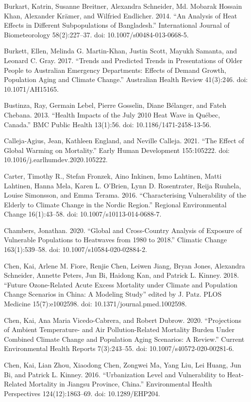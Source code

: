 \documentclass[12pt]{article}
\begin{document}
Burkart, Katrin, Susanne Breitner, Alexandra Schneider, Md. Mobarak
Hossain Khan, Alexander Krämer, and Wilfried Endlicher. 2014. ``An
Analysis of Heat Effects in Different Subpopulations of Bangladesh.''
International Journal of Biometeorology 58(2):227--37. doi:
10.1007/s00484-013-0668-5.

Burkett, Ellen, Melinda G. Martin-Khan, Justin Scott, Mayukh Samanta,
and Leonard C. Gray. 2017. ``Trends and Predicted Trends in
Presentations of Older People to Australian Emergency Departments:
Effects of Demand Growth, Population Aging and Climate Change.''
Australian Health Review 41(3):246. doi: 10.1071/AH15165.

Bustinza, Ray, Germain Lebel, Pierre Gosselin, Diane Bélanger, and Fateh
Chebana. 2013. ``Health Impacts of the July 2010 Heat Wave in Québec,
Canada.'' BMC Public Health 13(1):56. doi: 10.1186/1471-2458-13-56.

Calleja-Agius, Jean, Kathleen England, and Neville Calleja. 2021. ``The
Effect of Global Warming on Mortality.'' Early Human Development
155:105222. doi: 10.1016/j.earlhumdev.2020.105222.

Carter, Timothy R., Stefan Fronzek, Aino Inkinen, Ismo Lahtinen, Matti
Lahtinen, Hanna Mela, Karen L. O'Brien, Lynn D. Rosentrater, Reija
Ruuhela, Louise Simonsson, and Emma Terama. 2016. ``Characterising
Vulnerability of the Elderly to Climate Change in the Nordic Region.''
Regional Environmental Change 16(1):43--58. doi:
10.1007/s10113-014-0688-7.

Chambers, Jonathan. 2020. ``Global and Cross-Country Analysis of
Exposure of Vulnerable Populations to Heatwaves from 1980 to 2018.''
Climatic Change 163(1):539--58. doi: 10.1007/s10584-020-02884-2.

Chen, Kai, Arlene M. Fiore, Renjie Chen, Leiwen Jiang, Bryan Jones,
Alexandra Schneider, Annette Peters, Jun Bi, Haidong Kan, and Patrick L.
Kinney. 2018. ``Future Ozone-Related Acute Excess Mortality under
Climate and Population Change Scenarios in China: A Modeling Study''
edited by J. Patz. PLOS Medicine 15(7):e1002598. doi:
10.1371/journal.pmed.1002598.

Chen, Kai, Ana Maria Vicedo-Cabrera, and Robert Dubrow. 2020.
``Projections of Ambient Temperature- and Air Pollution-Related
Mortality Burden Under Combined Climate Change and Population Aging
Scenarios: A Review.'' Current Environmental Health Reports
7(3):243--55. doi: 10.1007/s40572-020-00281-6.

Chen, Kai, Lian Zhou, Xiaodong Chen, Zongwei Ma, Yang Liu, Lei Huang,
Jun Bi, and Patrick L. Kinney. 2016. ``Urbanization Level and
Vulnerability to Heat-Related Mortality in Jiangsu Province, China.''
Environmental Health Perspectives 124(12):1863--69. doi: 10.1289/EHP204.
\end{document}
